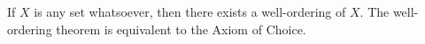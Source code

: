 \documentclass[12pt]{article}
\begin{document}
If $X$ is any set whatsoever, then there exists a well-ordering of $X$.  The well-ordering theorem is equivalent to the Axiom of Choice.
\end{document}
